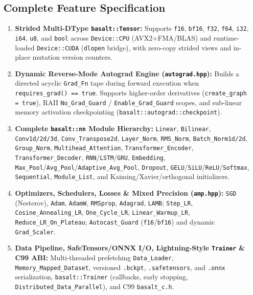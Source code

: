 \documentclass[11pt,a4paper]{article}
\begin{document}
\subsection{Complete Feature Specification}
\begin{enumerate}[leftmargin=1.5em]
  \item \textbf{Strided Multi-DType \texttt{basalt::Tensor}:} Supports \texttt{f16}, \texttt{bf16}, \texttt{f32}, \texttt{f64}, \texttt{i32}, \texttt{i64}, \texttt{u8}, and \texttt{bool} across \texttt{Device::CPU} (AVX2+FMA/BLAS) and runtime-loaded \texttt{Device::CUDA} (\texttt{dlopen} bridge), with zero-copy strided views and in-place mutation version counters.
  \item \textbf{Dynamic Reverse-Mode Autograd Engine (\texttt{autograd.hpp}):} Builds a directed acyclic \texttt{Grad\_Fn} tape during forward execution when \texttt{requires\_grad() == true}. Supports higher-order derivatives (\texttt{create\_graph = true}), RAII \texttt{No\_Grad\_Guard} / \texttt{Enable\_Grad\_Guard} scopes, and sub-linear memory activation checkpointing (\texttt{basalt::autograd::checkpoint}).
  \item \textbf{Complete \texttt{basalt::nn} Module Hierarchy:} \texttt{Linear}, \texttt{Bilinear}, \texttt{Conv1d/2d/3d}, \texttt{Conv\_Transpose2d}, \texttt{Layer\_Norm}, \texttt{RMS\_Norm}, \texttt{Batch\_Norm1d/2d}, \texttt{Group\_Norm}, \texttt{Multihead\_Attention}, \texttt{Transformer\_Encoder}, \texttt{Transformer\_Decoder}, \texttt{RNN}/\texttt{LSTM}/\texttt{GRU}, \texttt{Embedding}, \texttt{Max\_Pool}/\texttt{Avg\_Pool}/\texttt{Adaptive\_Avg\_Pool}, \texttt{Dropout}, \texttt{GELU}/\texttt{SiLU}/\texttt{ReLU}/\texttt{Softmax}, \texttt{Sequential}, \texttt{Module\_List}, and Kaiming/Xavier/orthogonal initializers.
  \item \textbf{Optimizers, Schedulers, Losses \& Mixed Precision (\texttt{amp.hpp}):} \texttt{SGD} (Nesterov), \texttt{Adam}, \texttt{AdamW}, \texttt{RMSprop}, \texttt{Adagrad}, \texttt{LAMB}; \texttt{Step\_LR}, \texttt{Cosine\_Annealing\_LR}, \texttt{One\_Cycle\_LR}, \texttt{Linear\_Warmup\_LR}, \texttt{Reduce\_LR\_On\_Plateau}; \texttt{Autocast\_Guard} (\texttt{f16}/\texttt{bf16}) and dynamic \texttt{Grad\_Scaler}.
  \item \textbf{Data Pipeline, SafeTensors/ONNX I/O, Lightning-Style \texttt{Trainer} \& C99 ABI:} Multi-threaded prefetching \texttt{Data\_Loader}, \texttt{Memory\_Mapped\_Dataset}, versioned \texttt{.bckpt}, \texttt{.safetensors}, and \texttt{.onnx} serialization, \texttt{basalt::Trainer} (callbacks, early stopping, \texttt{Distributed\_Data\_Parallel}), and C99 \texttt{basalt\_c.h}.
\end{enumerate}
\end{document}

